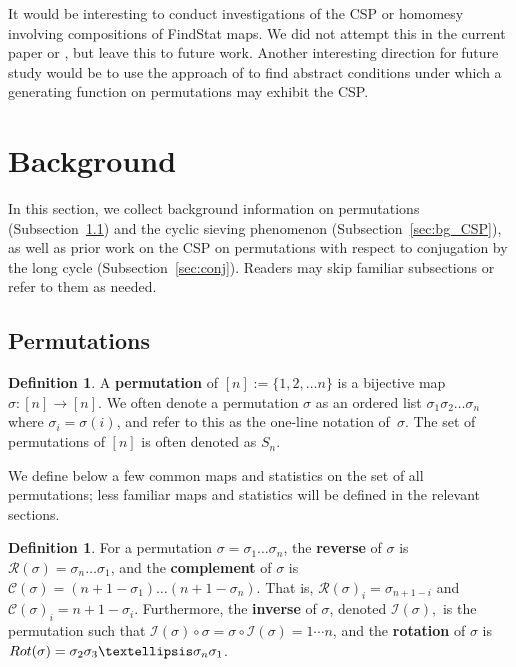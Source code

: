 \documentclass{amsart}
\theoremstyle{definition}
\newtheorem{definition}[thm]{Definition}
\newcommand{\C}{\mathcal{C}} %
\newcommand{\R}{\mathcal{R}} %
\newcommand{\I}{\mathcal{I}} %
\newcommand{\rot}{\textnormal{Rot}} %
\begin{document}
It would be interesting to conduct investigations of the CSP or homomesy involving compositions of FindStat maps. We did not attempt this in the current paper or \cite{ELMSW22}, but leave this to future work. Another interesting direction for future study would be to use the approach of \cite{AlexAmini} to find abstract conditions under which a generating function on permutations may exhibit the CSP.



\section{Background}\label{sec:bg}
In this section, we collect background information on permutations (Subsection~\ref{sec:bg_perm}) and the cyclic sieving phenomenon (Subsection~\ref{sec:bg_CSP}), as well as prior work on the CSP on permutations with respect to conjugation by the long cycle (Subsection~\ref{sec:conj}). Readers  may skip familiar subsections or refer to them as needed.
\subsection{Permutations}
\label{sec:bg_perm}
\begin{definition}
  A \textbf{permutation} of $[n]:=\{1,2,\ldots n\}$ is a bijective map $\sigma:[n]\rightarrow[n]$. We often denote a permutation $\sigma$ as an ordered list $\sigma_1\sigma_2\ldots\sigma_n$ where $\sigma_i=\sigma(i)$, and refer to this as the one-line notation of~$\sigma$. The set of permutations of $[n]$ is often denoted as $S_n$.
\end{definition}

We define below a few common maps and statistics on the set of all permutations; less familiar maps and statistics will be defined in the relevant sections.

\begin{definition}\label{def:maps}
  For a permutation $\sigma = \sigma_1 \ldots \sigma_n$,  the \textbf{reverse} of $\sigma$ is $\R(\sigma) = \sigma_n\ldots \sigma_1$, and the \textbf{complement} of $\sigma$ is $\C(\sigma) = (n+1-\sigma_1)\ldots(n+1-\sigma_n)$. That is,   $\R(\sigma)_i=\sigma_{n+1-i}$ and $\C(\sigma)_i =n+1 - \sigma_i$. Furthermore, the \textbf{inverse} of $\sigma$, denoted $\I(\sigma),$ is the permutation  such that $\I(\sigma) \circ \sigma = \sigma \circ \I(\sigma) = 1\cdots n$, and the \textbf{rotation} of $\sigma$ is $\rot(\sigma) = \sigma_2\sigma_3\ldots \sigma_n\sigma_1$.
\end{definition}
\end{document}
